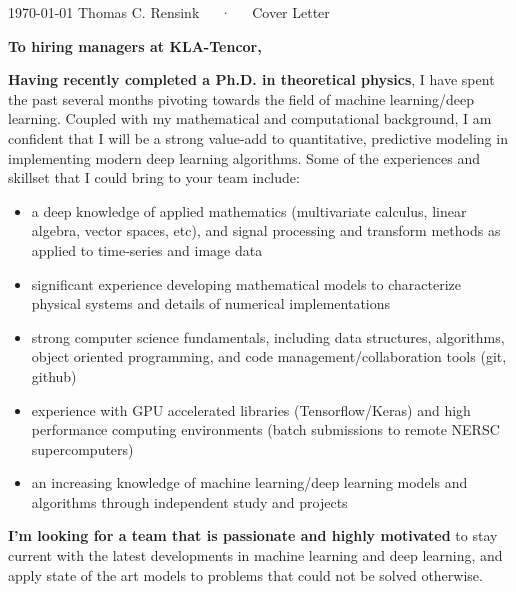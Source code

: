\documentclass[13pt, a4paper]{awesome-cv}
\begin{document}
\makecvheader[R]

\makecvfooter
  {\today}
  {Thomas C. Rensink~~~·~~~Cover Letter}
  {}


\begin{cvletter}

\bigskip
\bigskip
\bigskip
\bigskip
\textbf{To hiring managers at KLA-Tencor,}
\bigskip
\bigskip
 
\textbf{Having recently completed a Ph.D. in theoretical physics}, I have spent the past several months pivoting towards the field of machine learning/deep learning.   Coupled with my mathematical and computational background, I am confident that I will be a strong value-add to quantitative, predictive modeling in implementing modern deep learning algorithms.  Some of the experiences and skillset that I could bring to your team include:
 
\begin{itemize}
\item a deep knowledge of applied mathematics (multivariate calculus, linear algebra, vector spaces, etc), and signal processing and transform methods as applied to time-series and image data
\item significant experience developing mathematical models to characterize physical systems and details of numerical implementations
\item strong computer science fundamentals, including data structures, algorithms, object oriented programming, and code management/collaboration tools (git, github)
\item experience with GPU accelerated libraries (Tensorflow/Keras) and high performance computing environments (batch submissions to remote NERSC supercomputers)
 \item an increasing knowledge of machine learning/deep learning models and algorithms through independent study and projects
\end{itemize}
\bigskip
\textbf{I'm looking for a team that is passionate and highly motivated} to stay current with the latest developments in machine learning and deep learning, and apply state of the art models to problems that could not be solved otherwise.


\end{cvletter}
\end{document}
